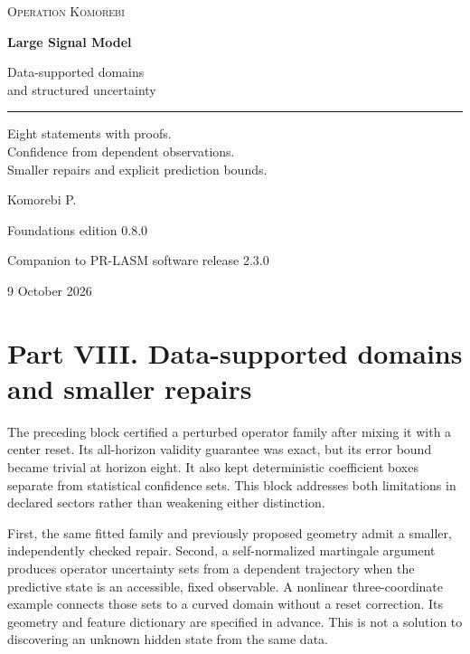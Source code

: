 \documentclass[11pt,letterpaper]{article}
\begin{document}
\hypersetup{pageanchor=false}
\begin{titlepage}
\vspace*{0.5in}
{\small\textsc{Operation Komorebi}\par}
\vspace{0.72in}
{\fontsize{33}{39}\selectfont\bfseries Large Signal Model\par}
\vspace{0.3in}
{\fontsize{21}{27}\selectfont Data-supported domains\\and structured uncertainty\par}
\vspace{0.45in}
\rule{\textwidth}{0.45pt}\par
\vspace{0.3in}
\begin{minipage}{0.95\textwidth}
\large
Eight statements with proofs.\\Confidence from dependent observations.\\Smaller repairs and explicit prediction bounds.
\end{minipage}
\vfill
{\Large Komorebi P.\par}
\vspace{0.2in}
{\normalsize Foundations edition 0.8.0\par}
{\normalsize Companion to PR-LASM software release 2.3.0\par}
{\normalsize 9 October 2026\par}
\end{titlepage}
\hypersetup{pageanchor=true}
\begingroup
\footnotesize
\setlength{\cftbeforesecskip}{1pt}
\tableofcontents
\endgroup
\newpage

\section{Part VIII. Data-supported domains and smaller
repairs}\label{part-viii.-data-supported-domains-and-smaller-repairs}

The preceding block certified a perturbed operator family after mixing
it with a center reset. Its all-horizon validity guarantee was exact,
but its error bound became trivial at horizon eight. It also kept
deterministic coefficient boxes separate from statistical confidence
sets. This block addresses both limitations in declared sectors rather
than weakening either distinction.

First, the same fitted family and previously proposed geometry admit a
smaller, independently checked repair. Second, a self-normalized
martingale argument produces operator uncertainty sets from a dependent
trajectory when the predictive state is an accessible, fixed observable.
A nonlinear three-coordinate example connects those sets to a curved
domain without a reset correction. Its geometry and feature dictionary
are specified in advance. This is not a solution to discovering an
unknown hidden state from the same data.
\end{document}
